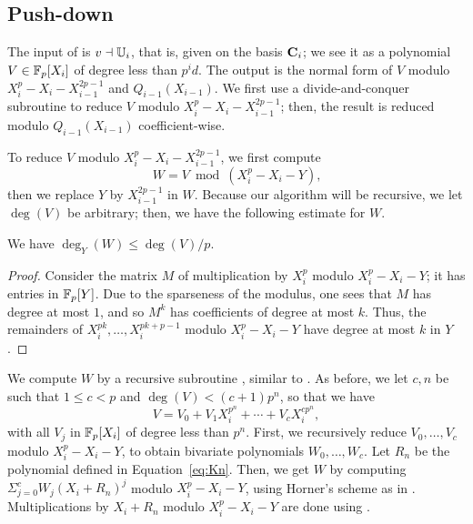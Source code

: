 
\subsection{Push-down}\label{sec:level-embedding:push-down}

The input of \hyperref[alg:push-down]{} is $v \dashv \mathbb{U}_i$, that is, given on the
basis $\mathbf{C}_i$; we see it as a polynomial $V \in \mathbb{F}_p[X_i]$ of degree
less than $p^id$. The output is the normal form of $V$ modulo
$X_i^p-X_i-X_{i-1}^{2p-1}$ and $Q_{i-1}(X_{i-1})$. We first use a
divide-and-conquer subroutine to reduce $V$ modulo
$X_i^p-X_i-X_{i-1}^{2p-1}$; then, the result is reduced modulo
$Q_{i-1}(X_{i-1})$ coefficient-wise.

To reduce $V$ modulo $X_i^p-X_i-X_{i-1}^{2p-1}$, we first compute 
\begin{equation}
  \label{eq:91}
  W=V \bmod (X_i^p-X_i-Y)
  \text{,} 
\end{equation}
then we replace $Y$ by $X_{i-1}^{2p-1}$ in $W$.  Because our algorithm
will be recursive, we let $\deg(V)$ be arbitrary; then, we have the
following estimate for $W$.

\begin{lemma}
  \label{th:push-down-degree} We have $\deg_Y(W)\le \deg(V)/p$.
\end{lemma}
\begin{proof}
  Consider the matrix $M$ of multiplication by $X_i^p$ modulo
  $X_i^p-X_i-Y$; it has entries in $\mathbb{F}_p[Y]$. Due to the sparseness of
  the modulus, one sees that $M$ has degree at most $1$, and so $M^k$
  has coefficients of degree at most $k$. Thus, the remainders of
  $X_i^{pk},\dots,X_i^{pk+p-1}$ modulo $X_i^p-X_i-Y$ have degree at
  most $k$ in $Y$.
\end{proof}


We compute $W$ by a recursive subroutine \hyperref[alg:push-down-rec]{}, similar
to \hyperref[alg:compose]{}. As before, we let $c,n$ be such that $1\le c<p$ and
$\deg(V) < (c+1)p^n$, so that we have
$$V=V_0+ V_1X_i^{p^n}+\cdots+V_c X_i^{cp^n},$$ with all $V_j$ in
$\mathbb{F}_p[X_i]$ of degree less than $p^n$. First, we recursively reduce
$V_0,\dots,V_c$ modulo $X_i^p-X_i-Y$, to obtain bivariate
polynomials $W_0,\dots,W_{c}$. Let $R_n$ be the polynomial defined in
Equation~\eqref{eq:Kn}. Then, we get $W$ by computing
$\Sigma_{j=0}^c W_j(X_i+R_n)^j$ modulo $X_i^p-X_i-Y$,
using Horner's scheme as in \hyperref[alg:compose]{}. Multiplications by
$X_i+R_n$ modulo $X_i^p-X_i-Y$ are done using \hyperref[eq:89]{}.


